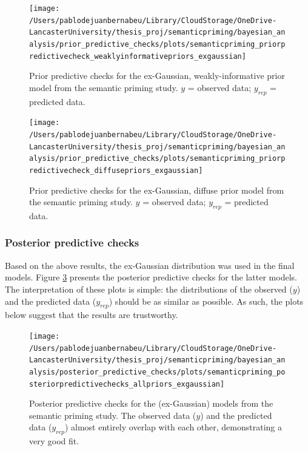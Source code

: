 \documentclass[
  12pt,
  man,floatsintext]{apa7}
\begin{document}
\begin{figure}

{\centering \texttt{[image: /Users/pablodejuanbernabeu/Library/CloudStorage/OneDrive-LancasterUniversity/thesis\_proj/semanticpriming/bayesian\_analysis/prior\_predictive\_checks/plots/semanticpriming\_priorpredictivecheck\_weaklyinformativepriors\_exgaussian]} 

}

\caption{Prior predictive checks for the ex-Gaussian, weakly-informative prior model from the semantic priming study. \(y\) = observed data; \(y_{rep}\) = predicted data.}\label{fig:semanticpriming-priorpredictivecheck-weaklyinformativepriors-exgaussian}
\end{figure}



\begin{figure}

{\centering \texttt{[image: /Users/pablodejuanbernabeu/Library/CloudStorage/OneDrive-LancasterUniversity/thesis\_proj/semanticpriming/bayesian\_analysis/prior\_predictive\_checks/plots/semanticpriming\_priorpredictivecheck\_diffusepriors\_exgaussian]} 

}

\caption{Prior predictive checks for the ex-Gaussian, diffuse prior model from the semantic priming study. \(y\) = observed data; \(y_{rep}\) = predicted data.}\label{fig:semanticpriming-priorpredictivecheck-diffusepriors-exgaussian}
\end{figure}

\hypertarget{posterior-predictive-checks}{%
\subsubsection{Posterior predictive checks}\label{posterior-predictive-checks}}

Based on the above results, the ex-Gaussian distribution was used in the final models. Figure \ref{fig:semanticpriming-posteriorpredictivechecks-allpriors-exgaussian} presents the posterior predictive checks for the latter models. The interpretation of these plots is simple: the distributions of the observed (\(y\)) and the predicted data (\(y_{rep}\)) should be as similar as possible. As such, the plots below suggest that the results are trustworthy.



\begin{figure}

{\centering \texttt{[image: /Users/pablodejuanbernabeu/Library/CloudStorage/OneDrive-LancasterUniversity/thesis\_proj/semanticpriming/bayesian\_analysis/posterior\_predictive\_checks/plots/semanticpriming\_posteriorpredictivechecks\_allpriors\_exgaussian]} 

}

\caption{Posterior predictive checks for the (ex-Gaussian) models from the semantic priming study. The observed data (\(y\)) and the predicted data (\(y_{rep}\)) almost entirely overlap with each other, demonstrating a very good fit.}\label{fig:semanticpriming-posteriorpredictivechecks-allpriors-exgaussian}
\end{figure}
\end{document}

